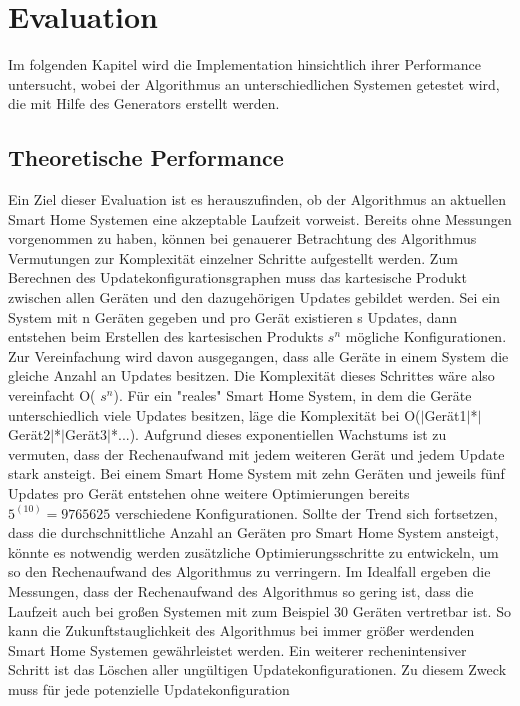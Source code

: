 \chapter{Evaluation}\label{ch:eval}

Im folgenden Kapitel wird die Implementation hinsichtlich ihrer Performance untersucht, wobei der Algorithmus an unterschiedlichen Systemen
getestet wird, die mit Hilfe des Generators erstellt werden. 

\section{Theoretische Performance}
Ein Ziel dieser Evaluation ist es herauszufinden, ob der Algorithmus an aktuellen Smart Home Systemen eine akzeptable Laufzeit vorweist.
Bereits ohne Messungen vorgenommen zu haben, können bei genauerer Betrachtung des Algorithmus Vermutungen zur Komplexität einzelner Schritte aufgestellt werden.
Zum Berechnen des Updatekonfigurationsgraphen muss das kartesische Produkt zwischen allen Geräten und den dazugehörigen Updates gebildet werden. 
Sei ein System mit n Geräten gegeben und pro Gerät existieren s Updates, dann entstehen beim Erstellen des kartesischen Produkts  \( s^n\) mögliche Konfigurationen.
Zur Vereinfachung wird davon ausgegangen, dass alle Geräte in einem System die gleiche Anzahl an Updates besitzen. Die Komplexität dieses Schrittes wäre also
vereinfacht O( \( s^n\)). Für ein "reales" Smart Home System, in dem die Geräte unterschiedlich viele Updates besitzen, läge die Komplexität bei
O($\vert$Gerät1$\vert$*$\vert$Gerät2$\vert$*$\vert$Gerät3$\vert$*...).
Aufgrund dieses exponentiellen Wachstums ist zu vermuten, dass der Rechenaufwand mit jedem weiteren Gerät und jedem Update stark ansteigt.
Bei einem Smart Home System mit zehn Geräten und jeweils fünf Updates pro Gerät entstehen ohne weitere Optimierungen bereits \( 5^{(10)} = 9765625\)
verschiedene Konfigurationen. Sollte der Trend sich fortsetzen, dass die durchschnittliche Anzahl an Geräten pro Smart Home System ansteigt, könnte
es notwendig werden zusätzliche Optimierungsschritte zu entwickeln, um so den Rechenaufwand des Algorithmus zu verringern.
Im Idealfall ergeben die Messungen, dass der Rechenaufwand des Algorithmus so gering ist, dass die Laufzeit auch bei großen Systemen
mit zum Beispiel 30 Geräten vertretbar ist. So kann die Zukunftstauglichkeit des Algorithmus bei immer größer werdenden Smart Home Systemen
gewährleistet werden.
Ein weiterer rechenintensiver Schritt ist das Löschen aller ungültigen Updatekonfigurationen. Zu diesem Zweck muss für jede potenzielle Updatekonfiguration
